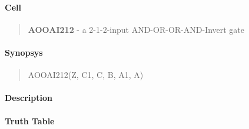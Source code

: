 \label{AOOAI212}
\paragraph{Cell}
\begin{quote}
    \textbf{AOOAI212} - a 2-1-2-input AND-OR-OR-AND-Invert gate
\end{quote}

\paragraph{Synopsys}
\begin{quote}
    AOOAI212(Z, C1, C, B, A1, A)
\end{quote}

\paragraph{Description}

%

\paragraph{Truth Table}
%

